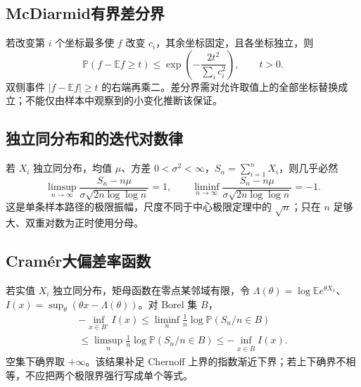 \documentclass[../main.tex]{subfiles}
\begin{document}
\subsection{McDiarmid有界差分界}
若改变第 $i$ 个坐标最多使 $f$ 改变 $c_i$，其余坐标固定，且各坐标独立，则
\[
\mathbb P(f-\mathbb Ef\ge t)\le
\exp\left(-\frac{2t^2}{\sum_i c_i^2}\right),\qquad t>0.
\]
双侧事件 $|f-\mathbb Ef|\ge t$ 的右端再乘二。差分界需对允许取值上的全部坐标替换成立；不能仅由样本中观察到的小变化推断该保证。
\subsection{独立同分布和的迭代对数律}
若 $X_i$ 独立同分布，均值 $\mu$、方差 $0<\sigma^2<\infty$，$S_n=\sum_{i=1}^nX_i$，则几乎必然
\[
\limsup_{n\to\infty}\frac{S_n-n\mu}{\sigma\sqrt{2n\log\log n}}=1,
\qquad
\liminf_{n\to\infty}\frac{S_n-n\mu}{\sigma\sqrt{2n\log\log n}}=-1.
\]
这是单条样本路径的极限振幅，尺度不同于中心极限定理中的 $\sqrt n$；只在 $n$ 足够大、双重对数为正时使用分母。
\subsection{Cramér大偏差率函数}
若实值 $X_i$ 独立同分布，矩母函数在零点某邻域有限，令 $\Lambda(\theta)=\log\mathbb Ee^{\theta X_1}$、$I(x)=\sup_\theta(\theta x-\Lambda(\theta))$。对 Borel 集 $B$，
\begin{gather*}
-\inf_{x\in B^\circ}I(x)
\le\liminf_n\frac1n\log\mathbb P(S_n/n\in B)\\
\le\limsup_n\frac1n\log\mathbb P(S_n/n\in B)
\le-\inf_{x\in\overline B}I(x).
\end{gather*}
空集下确界取 $+\infty$。该结果补足 Chernoff 上界的指数渐近下界；若上下确界不相等，不应把两个极限界强行写成单个等式。
\clearpage
\end{document}
